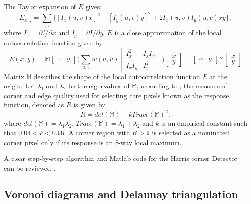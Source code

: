 \documentclass[10pt,a4paper]{article}
\theoremstyle{plain}
\theoremstyle{definition}
\begin{document}
     The Taylor expansion of $E$ gives:
     \begin{equation}
     E_{x,y} = \sum_{u,v} \{[I_x (u,v)x]^2 + [I_y(u,v)y]^2 + 2I_x(u,v)I_y (u,v)xy\},
     \end{equation}  
     where $I_x = \partial I / \partial x$ and $I_y = \partial I /\partial y$. $E$ is a close approximation of the local autocorrelation function given by
     \begin{equation}
     E(x,y) = \mathbb{M}\begin{bmatrix}
     x & y
     \end{bmatrix} \Bigg(\sum_{u,v} w(u,v)  
     \begin{bmatrix}
     I_x ^2 & I_x I_y  \\
     I_xI_y & I_y ^2
     \end{bmatrix}  \Bigg)\begin{bmatrix}
     x \\
     y
     \end{bmatrix}  = \begin{bmatrix}
     x & y
     \end{bmatrix} \mathbb{M}\begin{bmatrix}
     x \\
     y
     \end{bmatrix}
     \end{equation}
     Matrix $\mathbb{M}$ describes the shape of the local autocorrelation function $E$ at the origin.
     Let $\lambda_1$ and $\lambda_2$ be the eigenvalues of $\mathbb{M}$, according to \citep{harris1988combined}, the measure of corner and edge quality used for selecting core pixels known as the response function, denoted as $R$ is given by
     \begin{equation}
     R = det(\mathbb{M}) - kTrace(\mathbb{M})^2,
     \end{equation}       
     where $det(\mathbb{M})=\lambda_1 \lambda_2$, $Trace(\mathbb{M}) = \lambda_1+ \lambda_2$ and $k$ is an empirical constant such that $0.04 <k < 0.06$.
     A corner region with $R>0$ is selected as a nominated corner pixel only if its response is an $8$-way local maximum.
     
     A clear step-by-step algorithm and Matlab code for the Harris corner Detector can be reviewed \citep{stoica2011delaunay}.\\
     
     \subsection{Voronoi diagrams and Delaunay triangulation} 
\end{document}
